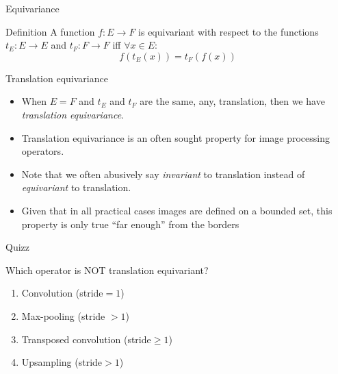 \documentclass[xcolor=pdftex,dvipsnames,table,mathserif]{beamer}
\begin{document}
\begin{frame}{Equivariance}

\begin{block}{Definition}
  A function $f: E \longrightarrow F$ is \alert{equivariant} with respect to the functions $t_E: E \longrightarrow E$ and $t_F: F \longrightarrow F$ iff $\forall x \in E$:
  \[
  f(t_E(x)) = t_F(f(x))
  \]
\end{block}

\end{frame}

\begin{frame}{Translation equivariance}

\begin{itemize}
  \item When $E=F$ and $t_E$ and $t_F$ are the same, any, translation, then we have \emph{translation equivariance}.
\item Translation equivariance is an often sought property for image processing operators.
\item Note that we often abusively say \emph{invariant} to translation instead of \emph{equivariant} to translation.
\item Given that in all practical cases images are defined on a bounded set, this property is only true ``far enough'' from the borders
\end{itemize}

\end{frame}


\begin{frame}{Quizz}

  \begin{quizzblock}{Which operator is NOT translation equivariant?}
    \begin{enumerate}
    \item Convolution (stride$=1$)
    \item Max-pooling (stride $>1$)
    \item Transposed convolution (stride$\geq 1$)
    \item Upsampling (stride$>1$)
    \end{enumerate}
  \end{quizzblock}

\end{frame}
\end{document}
